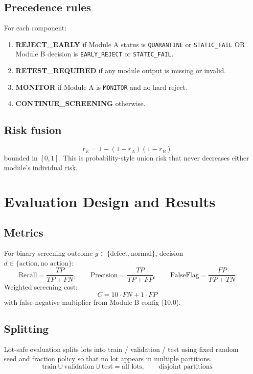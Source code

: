 \documentclass[11pt]{article}
\begin{document}
\subsection{Precedence rules}
For each component:
\begin{enumerate}[label=\arabic*.]
  \item \textbf{REJECT\_EARLY} if Module A status is \texttt{QUARANTINE} or \texttt{STATIC\_FAIL} OR Module B decision is \texttt{EARLY\_REJECT} or \texttt{STATIC\_FAIL}.
  \item \textbf{RETEST\_REQUIRED} if any module output is missing or invalid.
  \item \textbf{MONITOR} if Module A is \texttt{MONITOR} and no hard reject.
  \item \textbf{CONTINUE\_SCREENING} otherwise.
\end{enumerate}

\subsection{Risk fusion}
\[
 r_E = 1-(1-r_A)(1-r_B)
\]
bounded in \([0,1]\). This is probability-style union risk that never decreases either module’s individual risk.

\section{Evaluation Design and Results}

\subsection{Metrics}
For binary screening outcome \(y\in\{\text{defect},\text{normal}\}\), decision \(d\in\{\text{action},\text{no action}\}\):
\[
\mathrm{Recall}=\frac{TP}{TP+FN},\qquad
\mathrm{Precision}=\frac{TP}{TP+FP},\qquad
\mathrm{FalseFlag}=\frac{FP}{FP+TN}
\]
Weighted screening cost:
\[
 C = 10\cdot FN + 1\cdot FP
\]
with false-negative multiplier from Module B config (10.0).

\subsection{Splitting}
Lot-safe evaluation splits lots into train / validation / test using fixed random seed and fraction policy so that no lot appears in multiple partitions.
\[
\text{train}\cup \text{validation}\cup \text{test}=\text{all lots},\qquad \text{disjoint partitions}
\]
\end{document}
